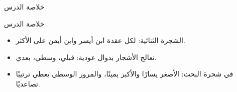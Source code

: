 \documentclass[aspectratio=169, 11pt, t, xcolor={table}]{beamer}
\begin{document}
\begin{frame}{خلاصة الدرس}
    \begin{tbox}{\faCheckCircle\quad خلاصة الدرس}
        \begin{itemize}
            \item الشجرة الثنائية: لكل عقدة ابن أيسر وابن أيمن على الأكثر.
            \item نعالج الأشجار بدوال عودية: قبلي، وسطي، بعدي.
            \item في شجرة البحث: الأصغر يسارًا والأكبر يمينًا، والمرور الوسطي يعطي ترتيبًا تصاعديًا.
        \end{itemize}
    \end{tbox}
\end{frame}
\end{document}

